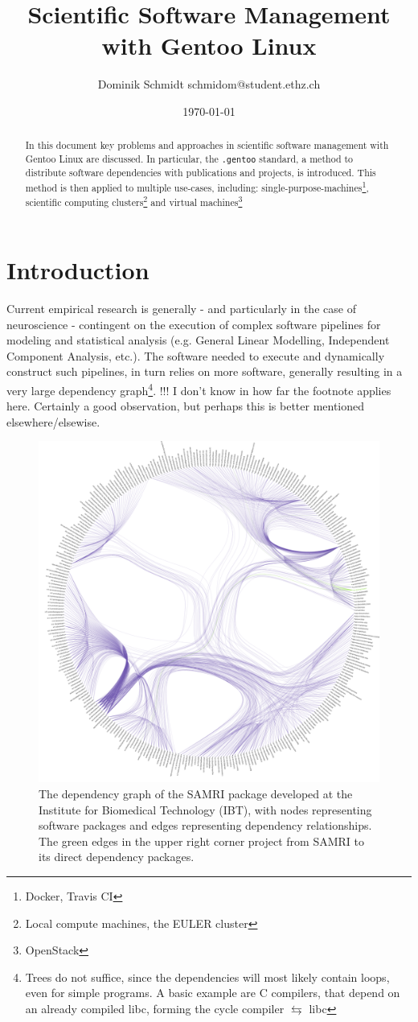 \documentclass[11pt]{scrartcl}
\author{Dominik Schmidt \textsf{schmidom@student.ethz.ch}}
\title{Scientific Software Management with Gentoo Linux}
\date{\today}
\newcommand{\dg}[1]{\texttt{#1}}
\begin{document}
	\maketitle
	\begin{abstract}
		In this document key problems and approaches in scientific
		software management with Gentoo Linux are discussed.
		In particular, the \dg{.gentoo} standard, a method to distribute software dependencies with publications and projects, is introduced.
		This method is then applied to multiple use-cases, including:
		single-purpose-machines\footnote{Docker, Travis CI},
		scientific computing clusters\footnote{Local compute machines, the EULER cluster}
		and virtual machines\footnote{OpenStack}
	\end{abstract}
	\section{Introduction}
		Current empirical research is generally - and particularly in the case of neuroscience - contingent on the execution of complex software pipelines for modeling and statistical analysis (e.g. General Linear Modelling, Independent Component Analysis, etc.).
		The software needed to execute and dynamically construct such pipelines, in turn relies on more software, generally resulting in a very large dependency graph\footnote{Trees do not suffice, since the dependencies will most likely contain loops, even for simple programs. A basic example are C compilers, that depend on an already compiled libc, forming the cycle compiler $\leftrightarrows$ libc}.
		!!! I don't know in how far the footnote applies here. Certainly a good observation, but perhaps this is better mentioned elsewhere/elsewise.

		\begin{figure}[H]
			\centering
			\includegraphics[width=0.75\linewidth]{graph/Real_Dependencygraph/RealDepgraph2.png}
			\caption{The dependency graph of the SAMRI package developed at the Institute for Biomedical Technology (IBT), with nodes representing software packages and edges representing dependency relationships.  The green edges in the upper right corner project from SAMRI to its direct dependency packages.}
		\end{figure}
		
\end{document}
